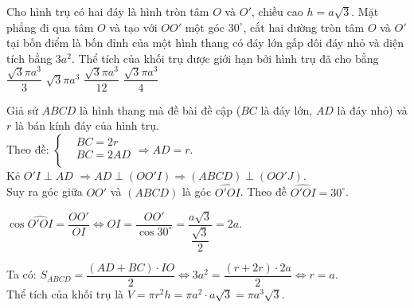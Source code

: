 \begin{ex} %
	Cho hình trụ có hai đáy là hình tròn tâm $ O$ và $O'$, chiều cao $ h=a\sqrt{3}$. Mặt phẳng đi qua tâm $ O$ và tạo với $ O{O}'$ một góc $ 30^\circ $, cắt hai đường tròn tâm $ O$ và $O'$ tại bốn điểm là bốn đỉnh của một hình thang có đáy lớn gấp đôi đáy nhỏ và diện tích bằng $ 3a^2$. Thể tích của khối trụ được giới hạn bởi hình trụ đã cho bằng
	\choice
	{$\dfrac{\sqrt{3}\pi{a^3}}{3}$}
	{\True $\sqrt{3}\pi{a^3}$}
	{$\dfrac{\sqrt{3}\pi{a^3}}{12}$}
	{$\dfrac{\sqrt{3}\pi{a^3}}{4}$}
	\loigiai
	{	\begin{center}
		\end{center}
		Giả sử $ABCD$ là hình thang mà đề bài đề cập ($BC$ là đáy lớn, $AD$ là đáy nhỏ) và $r$ là bán kính đáy của hình trụ.\\
		Theo đề: $\left\{\begin{aligned}
			& BC=2r\\ 
			& BC=2AD\\ 
		\end{aligned}\right.\Rightarrow AD=r$.\\
		Kẻ $O'I\perp AD$ $\Rightarrow AD\perp\left(O{O}'I\right)$$\Rightarrow\left(ABCD\right)\perp\left(O{O}'J\right)$.\\
		Suy ra góc giữa $O{O}'$ và $\left(ABCD\right)$ là góc $\widehat{O'OI}$. Theo đề $\widehat{O'OI}=30^\circ $.\\
		\begin{center}
			$\cos\widehat{O'OI}=\dfrac{O{O}'}{OI}\Leftrightarrow OI=\dfrac{O{O}'}{\cos 30^\circ}=\dfrac{a\sqrt{3}}{\dfrac{\sqrt{3}}{2}}=2a$.
		\end{center}
		Ta có: $S_{ABCD}=\dfrac{\left(AD+BC\right)\cdot IO}{2}\Leftrightarrow 3a^2=\dfrac{\left(r+2r\right)\cdot2a}{2}\Leftrightarrow r=a$.\\
		Thể tích của khối trụ là $V=\pi{r^2}h=\pi{a^2}\cdot a\sqrt{3}=\pi{a^3}\sqrt{3}$.}
\end{ex}
